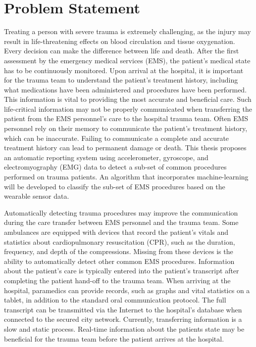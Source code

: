
\chapter{Problem Statement}
\label{ch:Problem-Statement}

Treating a person with severe trauma is extremely challenging, as the injury may result in life-threatening effects on blood circulation and tissue oxygenation. Every decision can make the difference between life and death. After the first assessment by the emergency medical services (\gls{EMS}), the patient's medical state has to be continuously monitored. Upon arrival at the hospital, it is important for the trauma team to understand the patient's treatment history, including what medications have been administered and procedures have been performed. This information is vital to providing the most accurate and beneficial care. Such life-critical information may not be properly communicated when transferring the patient from the \gls{EMS} personnel's care to the hospital trauma team. Often \gls{EMS} personnel rely on their memory to communicate the patient's treatment history, which can be inaccurate. Failing to communicate a complete and accurate treatment history can lead to permanent damage or death. This thesis proposes an automatic reporting system using accelerometer, gyroscope, and electromyography (\gls{EMG}) data to detect a sub-set of common procedures performed on trauma patients. An algorithm that incorporates machine-learning will be developed to classify the sub-set of \gls{EMS} procedures based on the wearable sensor data.
\par Automatically detecting trauma procedures may improve the communication during the care transfer between EMS personnel and the trauma team. Some ambulances are equipped with devices that record the patient's vitals and statistics about cardiopulmonary resuscitation (\gls{CPR}), such as the duration, frequency, and depth of the compressions. Missing from these devices is the ability to automatically detect other common EMS procedures. Information about the patient's care is typically entered into the patient's transcript after completing the patient hand-off to the trauma team. When arriving at the hospital, paramedics can provide records, such as graphs and vital statistics on a tablet, in addition to the standard oral communication protocol. The full transcript can be transmitted via the Internet to the hospital's database when connected to the secured city network. Currently, transferring information is a slow and static process. Real-time information about the patients state may be beneficial for the trauma team before the patient arrives at the hospital.
